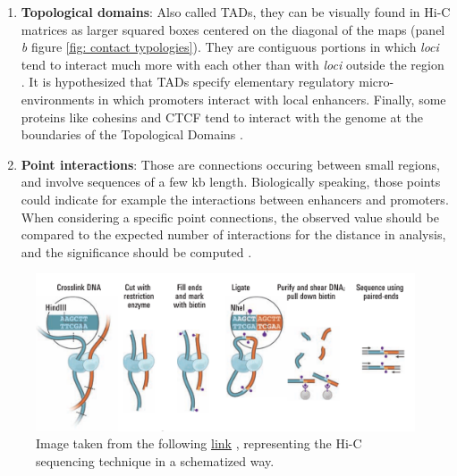 \begin{enumerate}
    \item \textbf{Topological domains}: Also called TADs, they can be visually found in Hi-C matrices as larger squared boxes centered on the diagonal of the maps (panel \textit{b} figure \ref{fig: contact typologies}). They are contiguous portions in which \textit{loci} tend to interact much more with each other than with \textit{loci} outside the region
    \cite{lajoieHitchhikerGuideHiC2015}. 
    It is hypothesized that TADs specify elementary regulatory micro-environments in which promoters interact with local enhancers. Finally, some proteins like cohesins and CTCF tend to interact with the genome at the boundaries of the Topological Domains
    \cite{lajoieHitchhikerGuideHiC2015}.
    
    \item \textbf{Point interactions}: Those are connections occuring between small regions, and involve sequences of a few kb length. Biologically speaking, those points could indicate for example the interactions between enhancers and promoters. When considering a specific point connections, the observed value should be compared to the expected number of interactions for the distance in analysis, and the significance should be computed
    \cite{lajoieHitchhikerGuideHiC2015}.
\end{enumerate}

\begin{figure}[H]
    \centering
    \includegraphics[width=0.7\linewidth]{./images/HiC-seq.png}
    \caption{Image taken from the following \href{https://data.4dnucleome.org/experiment-types/dilution-hi-c/}{link}
    \cite{lieberman-aidenComprehensiveMappingLong2009}, 
    representing the Hi-C sequencing technique in a schematized way.}
    \label{fig: HiC sequencing}
\end{figure}

